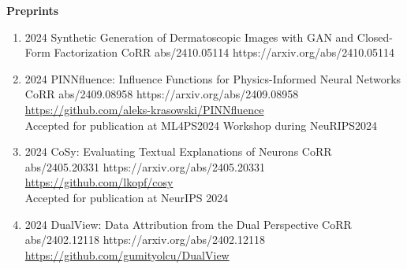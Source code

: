 \headedsection %
{\bf Preprints}{}
{
    \begin{enumerate}
    
        \item {}
                        {2024}
                        {Synthetic Generation of Dermatoscopic Images with GAN and Closed-Form Factorization}
                        {CoRR abs/2410.05114}
                        {https://arxiv.org/abs/2410.05114}
    
        \item {}
                        {2024}
                        {PINNfluence: Influence Functions for Physics-Informed Neural Networks}
                        {CoRR abs/2409.08958}
                        {https://arxiv.org/abs/2409.08958}
                        {\\\href{https://github.com/aleks-krasowski/PINNfluence}{https://github.com/aleks-krasowski/PINNfluence}\\
                        Accepted for publication at ML4PS2024 Workshop during NeuRIPS2024}

        \item {}
                        {2024}
                        {CoSy: Evaluating Textual Explanations of Neurons}
                        {CoRR abs/2405.20331}
                        {https://arxiv.org/abs/2405.20331}
                        {\\ \href{https://github.com/lkopf/cosy}{https://github.com/lkopf/cosy}\\
                        Accepted for publication at NeurIPS 2024}

        \item {}
                        {2024}
                        {DualView: Data Attribution from the Dual Perspective}
                        {CoRR abs/2402.12118}
                        {https://arxiv.org/abs/2402.12118}
                        {\\\href{https://github.com/gumityolcu/DualView}{https://github.com/gumityolcu/DualView}}


\end{enumerate}}
